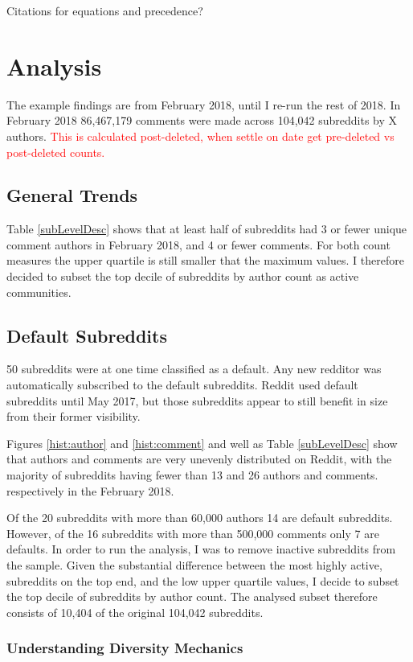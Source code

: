 \documentclass{article}
\begin{document}
Citations for equations and precedence?


\section{Analysis}

The example findings are from February 2018, until I re-run the rest of 2018. In February 2018 86,467,179 comments were made across 104,042 subreddits by X authors. \textcolor{red}{This is calculated post-deleted, when settle on date get pre-deleted vs post-deleted counts.}

\subsection{General Trends}

Table \ref{subLevelDesc} shows that at least half of subreddits had 3 or fewer unique comment authors in February 2018, and 4 or fewer comments. For both count measures the upper quartile is still smaller that the maximum values. I therefore decided to subset the top decile of subreddits by author count as active communities.


\subsection{Default Subreddits}
50 subreddits were at one time classified as a default. Any new redditor was automatically subscribed to the default subreddits. Reddit used default subreddits until May 2017, but those subreddits appear to still benefit in size from their former visibility.

Figures \ref{hist:author} and  \ref{hist:comment} and well as Table \ref{subLevelDesc} show that authors and comments are very unevenly distributed on Reddit, with the majority of subreddits having fewer than 13 and 26 authors and comments. respectively in the February 2018.

Of the 20 subreddits with more than 60,000 authors 14 are default subreddits. However, of the 16 subreddits with more than 500,000 comments only 7 are defaults. In order to run the analysis, I was to remove inactive subreddits from the sample. Given the substantial difference between the most highly active, subreddits on the top end, and the low upper quartile values, I decide to subset the top decile of subreddits by author count. The analysed subset therefore consists of 10,404 of the original 104,042 subreddits.


\subsubsection{Understanding Diversity Mechanics}
\end{document}
